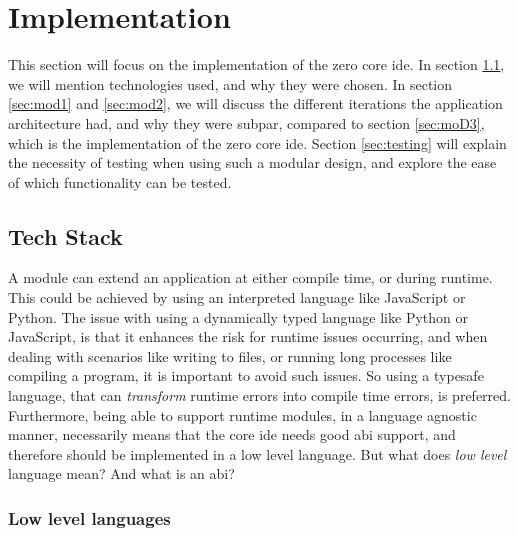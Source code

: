 \chapter{Implementation} \label{cha:impl}

This section will focus on the implementation of the zero core \gls{ide}. In
section \ref{sec:stack}, we will mention technologies used, and why they were
chosen. In section \ref{sec:mod1} and \ref{sec:mod2}, we will discuss the
different iterations the application architecture had, and why they were subpar,
compared to section \ref{sec:moD3}, which is the implementation of the zero core
\gls{ide}. Section \ref{sec:testing} will explain the necessity of testing when
using such a modular design, and explore the ease of which functionality can be
tested.

\section{Tech Stack} \label{sec:stack}

A module can extend an application at either compile time, or during runtime.
This could be achieved by using an interpreted language like JavaScript or
Python. The issue with using a dynamically typed language like Python or
JavaScript, is that it enhances the risk for runtime issues occurring, and when
dealing with scenarios like writing to files, or running long processes like
compiling a program, it is important to avoid such issues. So using a typesafe
language, that can \textit{transform} runtime errors into compile time errors,
is preferred. Furthermore, being able to support runtime modules, in a language
agnostic manner, necessarily means that the core \gls{ide} needs good
\gls{abi} support, and therefore should be implemented in a low level language.
But what does \textit{low level} language mean? And what is an \gls{abi}?

\subsection{Low level languages}

